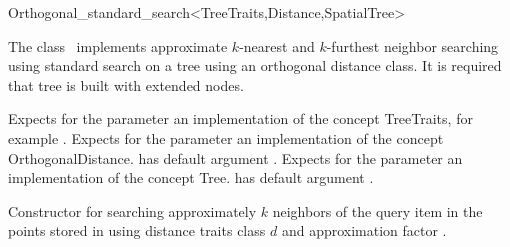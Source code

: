 

\begin{ccRefClass}{Orthogonal_standard_search<TreeTraits,Distance,SpatialTree>}  %


\ccDefinition

The class \ccRefName\ implements approximate $k$-nearest and $k$-furthest neighbor searching
using standard search on a  tree using an orthogonal distance
class. It is required that tree is built with extended nodes.


\ccParameters

Expects for the parameter  an implementation of the concept TreeTraits,
for example .
Expects for the parameter  an implementation of the
concept OrthogonalDistance.  has default argument 
.
Expects for the parameter  an implementation of the concept Tree.
 has default argument .


\ccTypes



\ccOperations

{Constructor for searching approximately $k$ neighbors of the query item  
in the points stored in  using 
distance
traits class $d$ and approximation factor .}


\end{ccRefClass}
